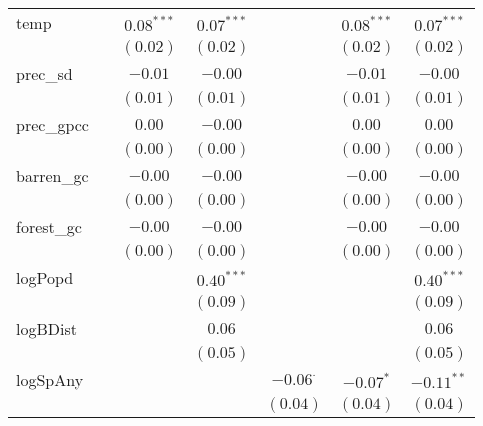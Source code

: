 \begin{sidewaystable}
\begin{center}
{\begin{tabular}{l c c c c c c}
temp            &                 & $0.08^{***}$    & $0.07^{***}$    &                 & $0.08^{***}$ & $0.07^{***}$    \\
                &                 & $(0.02)$        & $(0.02)$        &                 & $(0.02)$     & $(0.02)$        \\
prec\_sd        &                 & $-0.01$         & $-0.00$         &                 & $-0.01$      & $-0.00$         \\
                &                 & $(0.01)$        & $(0.01)$        &                 & $(0.01)$     & $(0.01)$        \\
prec\_gpcc      &                 & $0.00$          & $-0.00$         &                 & $0.00$       & $0.00$          \\
                &                 & $(0.00)$        & $(0.00)$        &                 & $(0.00)$     & $(0.00)$        \\
barren\_gc      &                 & $-0.00$         & $-0.00$         &                 & $-0.00$      & $-0.00$         \\
                &                 & $(0.00)$        & $(0.00)$        &                 & $(0.00)$     & $(0.00)$        \\
forest\_gc      &                 & $-0.00$         & $-0.00$         &                 & $-0.00$      & $-0.00$         \\
                &                 & $(0.00)$        & $(0.00)$        &                 & $(0.00)$     & $(0.00)$        \\
logPopd         &                 &                 & $0.40^{***}$    &                 &              & $0.40^{***}$    \\
                &                 &                 & $(0.09)$        &                 &              & $(0.09)$        \\
logBDist        &                 &                 & $0.06$          &                 &              & $0.06$          \\
                &                 &                 & $(0.05)$        &                 &              & $(0.05)$        \\
logSpAny        &                 &                 &                 & $-0.06^{\cdot}$ & $-0.07^{*}$  & $-0.11^{**}$    \\
                &                 &                 &                 & $(0.04)$        & $(0.04)$     & $(0.04)$        \\

\end{tabular}}
\end{center}
\end{sidewaystable}
